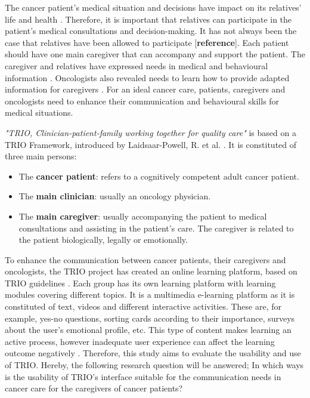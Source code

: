 \documentclass{sigchi}
\begin{document}
The cancer patient’s medical situation and decisions have impact on its relatives’ life and health \cite{Bevans2012}. Therefore, it is important that relatives can participate in the patient’s medical consultations and decision-making. It has not always been the case that relatives have been allowed to participate [\textbf{reference}]. Each patient should have one main caregiver that can accompany and support the patient. The caregiver and relatives have expressed needs in medical and behavioural information \cite{Lamore2017}. Oncologists also revealed needs to learn how to provide adapted information for caregivers \cite{Stuij2018}. For an ideal cancer care, patients, caregivers and oncologists need to enhance their communication and behavioural skills for medical situations. 

\textit{"TRIO, Clinician-patient-family working together for quality care"} is based on a TRIO Framework, introduced by Laidsaar-Powell, R. et al. \cite{Laidsaar-Powell2017}. It is constituted of three main persons:

\begin{itemize}
    \item The \textbf{cancer patient}: refers to a cognitively competent adult cancer patient.
    \item The \textbf{main clinician}: usually an oncology physician.
    \item The \textbf{main caregiver}: usually accompanying the patient to medical consultations and assisting in the patient’s care. The caregiver is related to the patient biologically, legally or emotionally.
\end{itemize}

To enhance the communication between cancer patients, their caregivers and oncologists, the TRIO project has created an online learning platform, based on TRIO guidelines \cite{Laidsaar-Powell2018a} \cite{Laidsaar-Powell2018}. Each group has its own learning platform with learning modules covering different topics. It is a multimedia e-learning platform as it is constituted of text, videos and different interactive activities. These are, for example, yes-no questions, sorting cards according to their importance, surveys about the user’s emotional profile, etc. This type of content makes learning an active process, however inadequate user experience can affect the learning outcome negatively \cite{Huang2005}. Therefore, this study aims to evaluate the usability and use of TRIO. Hereby, the following research question will be answered; In which ways is the usability of TRIO's interface suitable for the communication needs in cancer care for the caregivers of cancer patients?
\end{document}
